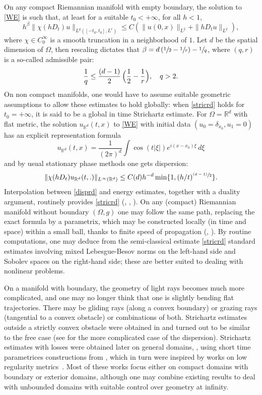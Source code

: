 \documentclass[JEP,XML,SOM,Unicode,NoEqCountersInSection,NoFloatCountersInSection,published]{cedram}
\newcommand{\psfrac}[2]{\sfrac{(#1)}{#2}}
\theoremstyle{plain}
\theoremstyle{definition}
\begin{document}
On any compact Riemannian manifold with empty boundary, the solution to \eqref{WE} is such that, at least for a suitable $t_{0}<+\infty$, for all $h<1$,
\begin{equation}\label{stricrd} h^{\beta}\|\chi(hD_t)u\|_{L^q([-t_{0},t_{0}],
L^r)}\leq C\left(\|u(0,x)\|_{L^2}+\|hD_t u\|_{L^2}\right),
\end{equation}
where $\chi\in C^{\infty}_0$ is a smooth truncation in a neighborhood of $1$. Let $d$ be the spatial dimension of $\Omega$, then rescaling dictates that $\beta=d\left(\sfrac 12-\sfrac 1r\right)-\sfrac 1q$, where $(q,r)$ is a so-called admissible pair:
\begin{equation}\label{adm}
\frac 1q\leq \frac{(d-1)} 2\, \Bigl(\frac{1}{2}-\frac{1}{r}\Bigr),\quad q>2.
\end{equation}
On non compact manifolds, one would have to assume suitable geometric assumptions to allow these estimates to hold globally: when \eqref{stricrd} holds for $t_{0}=+\infty$, it is said to be a global in time Strichartz estimate. For $\Omega=\mathbb{R}^d$ with flat metric, the solution $u_{\mathbb{R}^d}(t,x)$ to
\eqref{WE} with initial data $(u_0=\delta_{x_{0}}, u_1=0)$ has an explicit representation formula
\[
u_{\mathbb{R}^d}(t,x)=\frac{1}{(2\pi)^d}\int
\cos(t|\xi|)e^{i(x-x_{0})\xi}\,d\xi
\]
and by usual stationary phase methods one gets dispersion:
\begin{equation}\label{disprd}
\|\chi(hD_t)u_{\mathbb{R}^d}(t,.)\|_{L^{\infty}(\mathbb{R}^d)}\leq
C(d) h^{-d}\min\{1, (h/t)^{\psfrac{d-1}{2}}\}.
\end{equation}
Interpolation between \eqref{disprd} and energy estimates, together with a duality argument, routinely provides
\eqref{stricrd} (\cite{Stri77}, \cite{Pe84}, \cite{GV85}). On any (compact) Riemannian manifold without boundary $(\Omega,g)$ one may follow the same path, replacing the exact formula by a parametrix, which may be constructed locally (in time and space) within a small ball, thanks to finite speed of propagation (\cite{Kapi89}, \cite{MSS93}). By routine computations, one may deduce from the semi-classical estimate \eqref{stricrd} standard estimates involving mixed Lebesgue-Besov norms on the left-hand side and Sobolev spaces on the right-hand side; these are better suited to dealing with nonlinear problems.

On a manifold with boundary, the geometry of light rays becomes much more complicated, and one may no longer think that one is slightly bending flat trajectories. There may be gliding rays (along a convex boundary) or grazing rays (tangential to a convex obstacle) or combinations of both. Strichartz estimates outside a strictly convex obstacle were obtained in \cite{smso95} and turned out to be similar to the free case (see \cite{ildispext} for the more complicated case of the dispersion). Strichartz estimates with losses were obtained later on general domains, \cite{blsmso08}, using short time parametrices constructions from \cite{smso06}, which in turn were inspired by works on low regularity metrics~\cite{tat02}. Most of these works focus either on compact domains with boundary or exterior domains, although one may combine existing results to deal with unbounded domains with suitable control over geometry at infinity.
\end{document}
